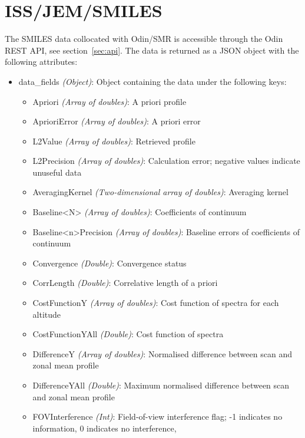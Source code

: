 \section{ISS/JEM/SMILES}
The SMILES data collocated with Odin/SMR is accessible through the Odin REST
API, see section~\ref{sec:api}. The data is returned as a JSON object with the
following attributes:
\begin{itemize}
    \item data\_fields \emph{(Object)}: Object containing the data under the
        following keys:
        \begin{itemize}
            \item Apriori \emph{(Array of doubles)}: A priori profile
            \item AprioriError \emph{(Array of doubles)}: A priori error
            \item L2Value \emph{(Array of doubles)}: Retrieved profile
            \item L2Precision \emph{(Array of doubles)}: Calculation error;
                negative values indicate unuseful data
            \item AveragingKernel \emph{(Two-dimensional array of doubles)}:
                Averaging kernel
            \item Baseline<N> \emph{(Array of doubles)}: Coefficients of
                continuum
            \item Baseline<n>Precision \emph{(Array of doubles)}: Baseline
                errors of coefficients of continuum
            \item Convergence \emph{(Double)}: Convergence status
            \item CorrLength \emph{(Double)}: Correlative length of a priori
            \item CostFunctionY \emph{(Array of doubles)}: Cost function of
                spectra for each altitude
            \item CostFunctionYAll \emph{(Double)}: Cost function of spectra
            \item DifferenceY \emph{(Array of doubles)}: Normalised 
                difference between scan and zonal mean profile
            \item DifferenceYAll \emph{(Double)}: Maximum normalised 
                difference between scan and zonal mean profile
            \item FOVInterference \emph{(Int)}: Field-of-view interference
                flag; -1 indicates no information, 0 indicates no interference,

\end{itemize}
\end{itemize}
